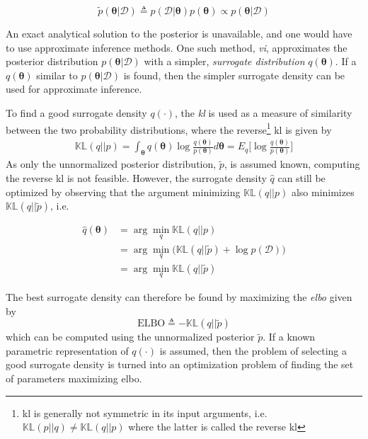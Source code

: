 \begin{equation}
    \tilde{p}(\boldsymbol{\theta} | \mathcal{D}) \triangleq p(\mathcal{D} | \boldsymbol{\theta})p(\boldsymbol{\theta}) \propto p(\boldsymbol{\theta} | \mathcal{D})
\end{equation}

An exact analytical solution to the posterior is unavailable, and one would have to use approximate inference methods. 
One such method, \textit{\acrfull{vi}}, approximates the posterior distribution $p(\boldsymbol{\theta} | \mathcal{D})$ with a simpler, \textit{surrogate distribution} $q(\boldsymbol{\theta})$. If a $q(\boldsymbol{\theta})$ similar to $p(\boldsymbol{\theta} | \mathcal{D})$ is found, then the simpler surrogate density can be used for approximate inference.

To find a good surrogate density $q(\cdot)$, the \textit{\acrfull{kl}} is used as a measure of similarity between the two probability distributions, where the reverse\footnote{\acrshort{kl} is generally not symmetric in its input arguments, i.e. $\mathbb{KL}(p || q) \neq \mathbb{KL}(q || p)$ where the latter is called the reverse \acrshort{kl}} \acrshort{kl} is given by
\begin{align}
    \mathbb{KL}(q || p) = \int_{\boldsymbol{\theta}} q(\boldsymbol{\theta}) \log \frac{q(\boldsymbol{\theta})}{p(\boldsymbol{\theta})} d\boldsymbol{\theta} = E_{q} \big[ \log \frac{q(\boldsymbol{\theta})}{p(\boldsymbol{\theta})} \big]\label{eq:kl_qp}
\end{align}
As only the unnormalized posterior distribution, $\tilde{p}$, is assumed known, computing the reverse \acrshort{kl} is not feasible. However, the surrogate density $\hat{q}$ can still be optimized by observing that the argument minimizing $\mathbb{KL}(q || p)$ also minimizes $\mathbb{KL}(q || \tilde{p})$, i.e.

\begin{align}
    \hat{q}(\boldsymbol{\theta}) &= \arg \min_q \mathbb{KL}(q || p)\\ &= \arg \min_q \big(\mathbb{KL}(q || \tilde{p}) + \log p(\mathcal{D})\big) \\&= \arg \min_q \mathbb{KL} (q || \tilde{p})
\end{align}

The best surrogate density can therefore be found by maximizing the \textit{\acrfull{elbo}} given by 
\begin{equation}
    \text{ELBO} \triangleq -\mathbb{KL}(q || \tilde{p})
\end{equation} which can be computed using the unnormalized posterior $\tilde{p}$. If a known parametric representation of $q(\cdot)$ is assumed, then the problem of selecting a good surrogate density is turned into an optimization problem of finding the set of parameters maximizing \acrshort{elbo}. 


